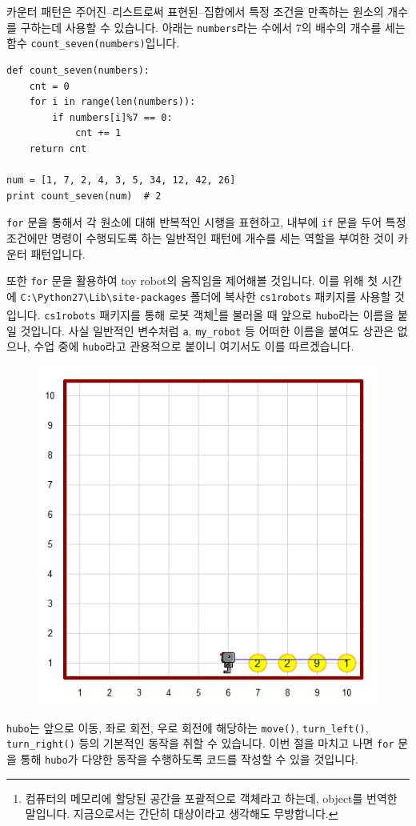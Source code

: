 \documentclass[../main.tex]{subfiles}
\begin{document}
카운터 패턴은 주어진--리스트로써 표현된--집합에서 특정 조건을 만족하는 원소의 개수를 구하는데 사용할 수 있습니다.
아래는 \texttt{numbers}라는 수에서 7의 배수의 개수를 세는 함수 \texttt{count\_seven(numbers)}입니다.
\begin{verbatim}
def count_seven(numbers):
	cnt = 0
	for i in range(len(numbers)):
		if numbers[i]%7 == 0:
			cnt += 1
	return cnt

num = [1, 7, 2, 4, 3, 5, 34, 12, 42, 26]
print count_seven(num)  # 2
\end{verbatim}
\texttt{for} 문을 통해서 각 원소에 대해 반복적인 시행을 표현하고, 내부에 \texttt{if} 문을 두어 특정 조건에만 명령이 수행되도록 하는 일반적인 패턴에 개수를 세는 역할을 부여한 것이 카운터 패턴입니다.

또한 \texttt{for} 문을 활용하여 toy robot의 움직임을 제어해볼 것입니다.
이를 위해 첫 시간에 \texttt{C:\textbackslash Python27\textbackslash Lib\textbackslash site-packages} 폴더에 복사한 \texttt{cs1robots} 패키지를 사용할 것입니다.
\texttt{cs1robots} 패키지를 통해 로봇 객체\footnote{컴퓨터의 메모리에 할당된 공간을 포괄적으로 객체라고 하는데, object를 번역한 말입니다. 지금으로서는 간단히 대상이라고 생각해도 무방합니다.}를 불러올 때 앞으로 \texttt{hubo}라는 이름을 붙일 것입니다.
사실 일반적인 변수처럼 \texttt{a}, \texttt{my\_robot} 등 어떠한 이름을 붙여도 상관은 없으나, 수업 중에 \texttt{hubo}라고 관용적으로 붙이니 여기서도 이를 따르겠습니다.
\begin{figure}[H]
\centering
\includegraphics[width=0.5\linewidth]{"./lectures/lecture4_example"}
\label{fig:lecture4example}
\end{figure}
\texttt{hubo}는 앞으로 이동, 좌로 회전, 우로 회전에 해당하는 \texttt{move()}, \texttt{turn\_left()}, \texttt{turn\_right()} 등의 기본적인 동작을 취할 수 있습니다.
이번 절을 마치고 나면 \texttt{for} 문을 통해 \texttt{hubo}가 다양한 동작을 수행하도록 코드를 작성할 수 있을 것입니다.
\end{document}
